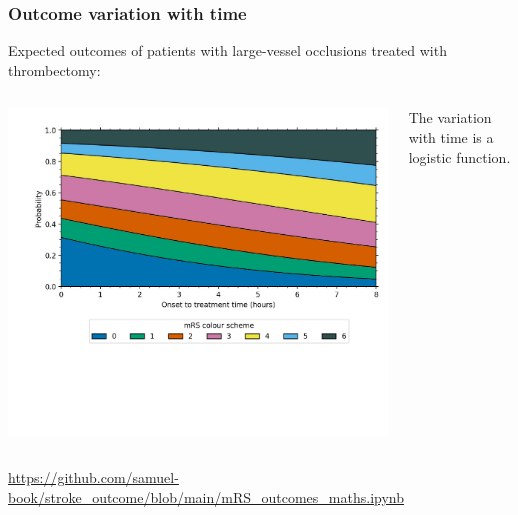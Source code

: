 \documentclass[xcolor={usenames,dvipsnames}]{beamer}
\newcommand{\smallurl}[1]{\textcolor{blue}{\fontsize{4pt}{4.8pt}\selectfont \url{#1}}}
\begin{document}
\begin{frame}
\frametitle{Outcome variation with time}

\footnotesize{Expected outcomes of patients with large-vessel occlusions treated with thrombectomy:} 



\begin{columns}
    \begin{center} 
    \includegraphics[width=\textwidth, trim=0em 5em 0em 0em, clip]{./images/dist_treatment_time_not_annotated}
    \end{center} 
    
    
    The variation with time is a logistic function. 

\end{columns}



\vspace{3em}
\smallurl{https://github.com/samuel-book/stroke_outcome/blob/main/mRS_outcomes_maths.ipynb}

\end{frame}


\end{document}
